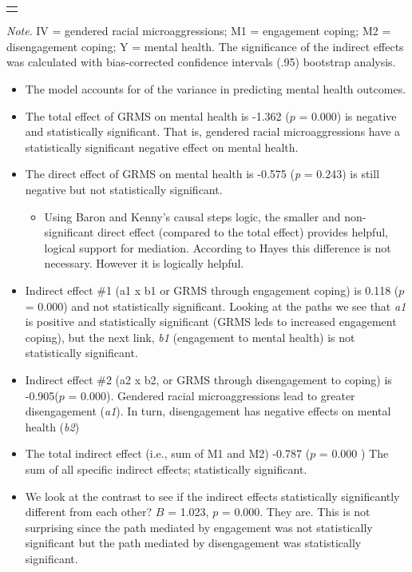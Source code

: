 \documentclass[
  11pt,
]{book}
\providecommand{\tightlist}{%
  \setlength{\itemsep}{0pt}\setlength{\parskip}{0pt}}
\begin{document}
\begin{longtable}[]{@{}
  >{\raggedright\arraybackslash}p{}@{}}
\toprule\noalign{}
\endhead
\bottomrule\noalign{}
\endlastfoot
\end{longtable}

\emph{Note}. IV = gendered racial microaggressions; M1 = engagement coping; M2 = disengagement coping; Y = mental health. The significance of the indirect effects was calculated with bias-corrected confidence intervals (.95) bootstrap analysis.

\begin{itemize}
\tightlist
\item
  The model accounts for of the variance in predicting mental health outcomes.
\item
  The total effect of GRMS on mental health is -1.362 (\(p\) = 0.000) is negative and statistically significant. That is, gendered racial microaggressions have a statistically significant negative effect on mental health.
\item
  The direct effect of GRMS on mental health is -0.575 (\emph{p} = 0.243) is still negative but not statistically significant.

  \begin{itemize}
  \tightlist
  \item
    Using Baron and Kenny's \citeyearpar{baron_moderator-mediator_1986} causal steps logic, the smaller and non-significant direct effect (compared to the total effect) provides helpful, logical support for mediation. According to Hayes \citeyearpar{hayes_introduction_2018} this difference is not necessary. However it is logically helpful.
  \end{itemize}
\item
  Indirect effect \#1 (a1 x b1 or GRMS through engagement coping) is 0.118 (\(p\) = 0.000) and not statistically significant. Looking at the paths we see that \emph{a1} is positive and statistically significant (GRMS leds to increased engagement coping), but the next link, \emph{b1} (engagement to mental health) is not statistically significant.
\item
  Indirect effect \#2 (a2 x b2, or GRMS through disengagement to coping) is -0.905(\(p\) = 0.000). Gendered racial microaggressions lead to greater disengagement (\emph{a1}). In turn, disengagement has negative effects on mental health (\emph{b2})
\item
  The total indirect effect (i.e., sum of M1 and M2) -0.787 (\(p\) = 0.000 ) The sum of all specific indirect effects; statistically significant.
\item
  We look at the contrast to see if the indirect effects statistically significantly different from each other? \(B\) = 1.023, \(p\) = 0.000. They are. This is not surprising since the path mediated by engagement was not statistically significant but the path mediated by disengagement was statistically significant.
\end{itemize}
\end{document}
